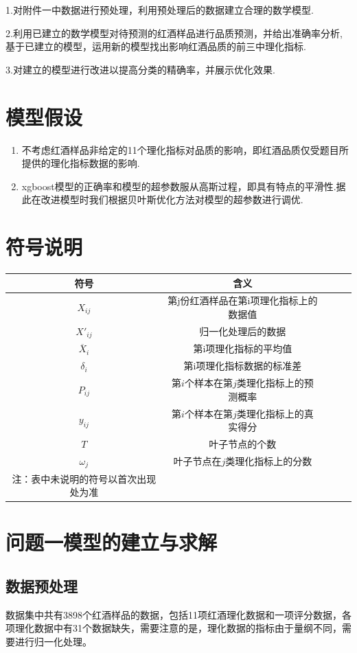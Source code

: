 \documentclass{whutmod}
\begin{document}
1.对附件一中数据进行预处理，利用预处理后的数据建立合理的数学模型.

2.利用已建立的数学模型对待预测的红酒样品进行品质预测，并给出准确率分析,基于已建立的模型，运用新的模型找出影响红酒品质的前三中理化指标.

3.对建立的模型进行改进以提高分类的精确率，并展示优化效果.



\section{模型假设}
\begin{enumerate}
	\item 不考虑红酒样品非给定的11个理化指标对品质的影响，即红酒品质仅受题目所提供的理化指标数据的影响.
	\item xgboost模型的正确率和模型的超参数服从高斯过程，即具有特点的平滑性.据此在改进模型时我们根据贝叶斯优化方法对模型的超参数进行调优.
\end{enumerate}


\section{符号说明}
\begin{center}
	\begin{tabular}{ccccc}
		\toprule[1.5pt]
		符号 & 含义\\
		\midrule[1pt]
		$X_{ij}$ & 第j份红酒样品在第i项理化指标上的数据值\\
		$X'_{ij}$ &归一化处理后的数据\\
		$\overline X_{i}$ &第i项理化指标的平均值\\
		$\delta_{i}$ &第i项理化指标数据的标准差\\
		$P_{ij}$ &第$i$个样本在第$j$类理化指标上的预测概率\\
		$y_{ij}$ &第$i$个样本在第$j$类理化指标上的真实得分\\
		$T$ &叶子节点的个数\\
		$\omega_{j}$ &叶子节点在$j$类理化指标上的分数\\
		\bottomrule[1.5pt]
		注：表中未说明的符号以首次出现处为准
	\end{tabular}
\end{center}



\section{问题一模型的建立与求解}
\subsection{数据预处理}
数据集中共有3898个红酒样品的数据，包括11项红酒理化数据和一项评分数据，各项理化数据中有31个数据缺失，需要注意的是，理化数据的指标由于量纲不同，需要进行归一化处理。
\end{document}
